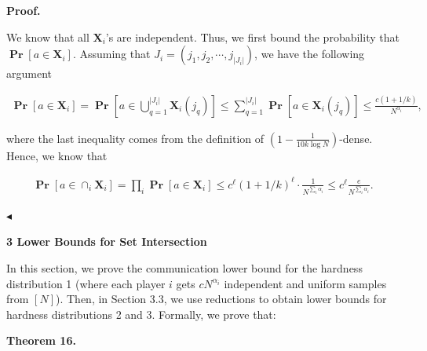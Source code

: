 \par\medskip\noindent\textbf{Proof.}\par




We know that all $\bm{X}_{i}$’s are independent. Thus, we first bound the probability that $\operatorname*{\mathbf{Pr}}[a\in\bm{X}_{i}]$. Assuming that $J_{i}=(j_{1},j_{2},\cdots,j_{|J_{i}|})$,
we have the following argument\par


\[\begin{gathered}
\operatorname*{\mathbf{Pr}}[a\in\bm{X}_{i}]=\operatorname*{\mathbf{Pr}}[a\in\bigcup_{q=1}^{|J_{i}|}\bm{X}_{i}(j_{q})]\leq\sum_{q=1}^{|J_{i}|}\operatorname*{\mathbf{Pr}}[a\in\bm{X}_{i}(j_{q})]\leq\frac{c(1+1/k)}{N^{\alpha_{i}}},
\end{gathered}\]


where the last inequality comes from the definition of $(1-\frac{1}{10k\log N})$-dense. Hence, we know that\par


\[\begin{gathered}
\operatorname*{\mathbf{Pr}}[a\in\cap_{i}\bm{X}_{i}]=\prod_{i}\operatorname*{\mathbf{Pr}}[a\in\bm{X}_{i}]\leq c^{\ell}(1+1/k)^{\ell}\cdot\frac{1}{N^{\sum_{i}\alpha_{i}}}\leq c^{\ell}\frac{e}{N^{\sum_{i}\alpha_{i}}}.\
\end{gathered}\]


$\blacktriangleleft$\par







\par\medskip\noindent\textbf{
3 Lower Bounds for Set Intersection}\par




In this section, we prove the communication lower bound for the hardness distribution 1 (where each player $i$ gets $cN^{\alpha_{i}}$ independent and uniform samples from $[N]$). Then, in Section 3.3, we use reductions to obtain lower bounds for hardness distributions 2 and 3. Formally, we prove that:\par





\par\medskip\noindent\textbf{
\textbf{Theorem 16}\textbf{.}
}\par



